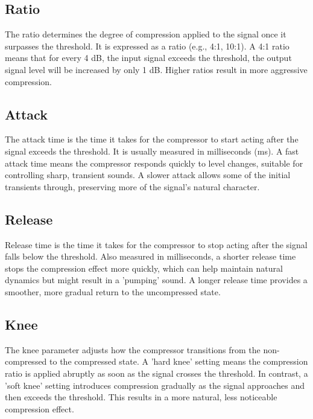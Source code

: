 \documentclass[10pt]{article}
\begin{document}
\begin{multicols*}{2}
            \subsection{Ratio}
                The ratio determines the degree of compression applied to the signal once it surpasses the threshold. It is expressed as a ratio (e.g., 4:1, 10:1). A 4:1 ratio means that for every 4 dB, the input signal exceeds the threshold, the output signal level will be increased by only 1 dB. Higher ratios result in more aggressive compression.

            \subsection{Attack}
                The attack time is the time it takes for the compressor to start acting after the signal exceeds the threshold. It is usually measured in milliseconds (ms). A fast attack time means the compressor responds quickly to level changes, suitable for controlling sharp, transient sounds. A slower attack allows some of the initial transients through, preserving more of the signal's natural character.

            \subsection{Release}
                Release time is the time it takes for the compressor to stop acting after the signal falls below the threshold. Also measured in milliseconds, a shorter release time stops the compression effect more quickly, which can help maintain natural dynamics but might result in a 'pumping' sound. A longer release time provides a smoother, more gradual return to the uncompressed state.
                    
            \subsection{Knee}
                The knee parameter adjusts how the compressor transitions from the non-compressed to the compressed state. A 'hard knee' setting means the compression ratio is applied abruptly as soon as the signal crosses the threshold. In contrast, a 'soft knee' setting introduces compression gradually as the signal approaches and then exceeds the threshold. This results in a more natural, less noticeable compression effect.
        

\end{multicols*}
\end{document}

